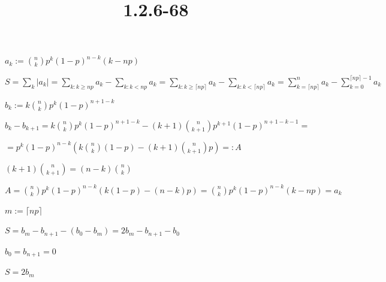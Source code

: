 \documentclass{article}
\title{1.2.6-68}
\begin{document}
\maketitle

\( a_k := \binom{n}{k}p^k(1-p)^{n-k}(k-np) \)

\( S = \sum_k |a_k| = \sum_{k: k \geq np} a_k - \sum_{k: k < np} a_k = \sum_{k: k \geq \lceil np \rceil} a_k - \sum_{k: k < \lceil np \rceil} a_k = \sum_{k = \lceil np \rceil}^n a_k - \sum_{k = 0}^{\lceil np \rceil - 1} a_k \)

\( b_k := k \binom{n}{k}p^k(1-p)^{n+1-k} \)

\( b_k - b_{k+1} = k \binom{n}{k}p^k(1-p)^{n+1-k} - (k+1) \binom{n}{k+1}p^{k+1}(1-p)^{n+1-k-1} = \)

\( = p^k(1-p)^{n-k} \left(k\binom{n}{k}(1-p) - (k+1)\binom{n}{k+1}p\right) =: A \)

\( (k+1)\binom{n}{k+1} = (n-k)\binom{n}{k} \)

\( A = \binom{n}{k}p^k(1-p)^{n-k}(k(1-p) - (n-k)p) = \binom{n}{k}p^k(1-p)^{n-k}(k - np) = a_k \)

\( m := \lceil np \rceil \)

\( S = b_m - b_{n+1} - (b_0 - b_m) = 2b_m - b_{n+1} - b_0 \)

\( b_0 = b_{n+1} = 0 \)

\( S = 2b_m \)
\end{document}
